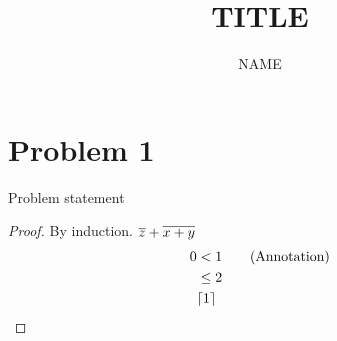 \documentclass{article}
\title{TITLE}
\author{NAME}
\begin{document}
	\section*{Problem 1}
    \begin{theorem}
        Problem statement
    \end{theorem}
    \begin{proof}
        By induction.
        $\overline{z} + \overline{x+y}$
        \begin{align*}
            0
            &< 1 \tag{Annotation}
            \\ &\leq 2
            \\&\lceil1\rceil \qedhere
        \end{align*}
    \end{proof}
\end{document}
